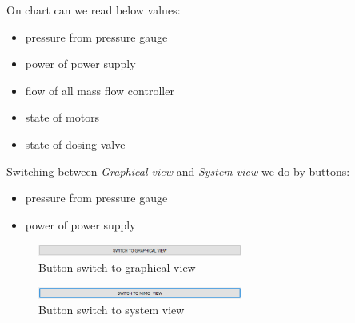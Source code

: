 On chart can we read below values:
\begin{itemize}
\item pressure from pressure gauge
\item power of power supply
\item flow of all mass flow controller
\item state of motors
\item state of dosing valve
\end{itemize} 

Switching between \textit{Graphical view} and \textit{System view} we do by buttons:
\begin{itemize}
\item pressure from pressure gauge
\item power of power supply
\end{itemize} 

	\begin{figure}[!h] 
	\centering \includegraphics[width=0.6\textwidth]{Graphic/MainScreen/BtnSwithToGraphicalView.png}	
	\caption{Button switch to graphical view}
	\label{button_switch_to_graphical_view}
	\end{figure}
	\FloatBarrier

	\begin{figure}[!h] 
	\centering \includegraphics[width=0.6\textwidth]{Graphic/MainScreen/BtnSwithToMIMC.png}	
	\caption{Button switch to system view}
	\label{Button_switch_to_ system_view}
	\end{figure}
	\FloatBarrier


